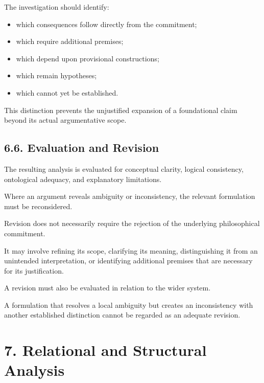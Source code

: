 The investigation should identify:

\begin{itemize}

    \item which consequences follow
    directly from the commitment;

    \item which require additional
    premises;

    \item which depend upon provisional
    constructions;

    \item which remain hypotheses;

    \item which cannot yet be established.

\end{itemize}

This distinction prevents the
unjustified expansion of a foundational
claim beyond its actual argumentative
scope.

\subsection*{6.6. Evaluation and Revision}

The resulting analysis is evaluated
for conceptual clarity, logical
consistency, ontological adequacy,
and explanatory limitations.

Where an argument reveals ambiguity
or inconsistency, the relevant
formulation must be reconsidered.

Revision does not necessarily require
the rejection of the underlying
philosophical commitment.

It may involve refining its scope,
clarifying its meaning, distinguishing
it from an unintended interpretation,
or identifying additional premises
that are necessary for its justification.

A revision must also be evaluated
in relation to the wider system.

A formulation that resolves a local
ambiguity but creates an inconsistency
with another established distinction
cannot be regarded as an adequate
revision.


\section*{7. Relational and Structural Analysis}

